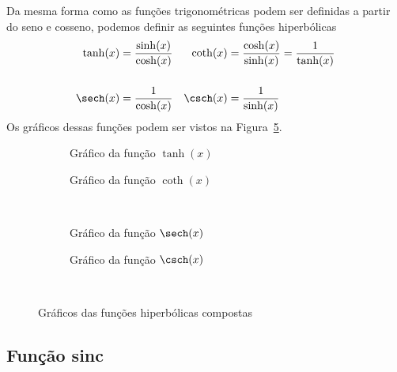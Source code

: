 Da mesma forma como as funções trigonométricas podem ser definidas a partir do seno e
cosseno, podemos definir as seguintes funções hiperbólicas
\begin{align*}
  \tanh(x) & = \frac{\sinh(x)}{\cosh(x)} &
  \coth(x) & = \frac{\cosh(x)}{\sinh(x)} = \frac{1}{\tanh(x)}\\[5mm]
  \sech(x) & = \frac{1}{\cosh(x)}       &
  \csch(x) & = \frac{1}{\sinh(x)}
\end{align*}
Os gráficos dessas funções podem ser vistos na Figura~\ref{fig:functions_hiper_2}.

\begin{figure}
  \centering
  \begin{subfigure}[b]{0.5\linewidth}
    \centering
    
    \caption{Gráfico da função $\tanh(x)$}
    \label{fig:functions_tanh}
  \end{subfigure}%
  \begin{subfigure}[b]{0.5\linewidth}
    \centering
    
    \caption{Gráfico da função $\coth(x)$}
    \label{fig:functions_coth}
  \end{subfigure}\\[0.5\baselineskip]
  \begin{subfigure}[b]{0.5\linewidth}
    \centering
    
    \caption{Gráfico da função $\sech(x)$}
    \label{fig:functions_sech}
  \end{subfigure}%
  \begin{subfigure}[b]{0.5\linewidth}
    \centering
    
    \caption{Gráfico da função $\csch(x)$}
    \label{fig:functions_csch}
  \end{subfigure}\\[0.5\baselineskip]
  \caption{Gráficos das funções hiperbólicas compostas}
  \label{fig:functions_hiper_2}
\end{figure}

\subsection*{Função sinc}


